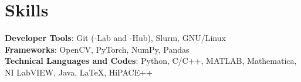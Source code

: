 \documentclass[letterpaper,11pt]{article}
\begin{document}
\section{Skills}
 \begin{itemize}[leftmargin=0.15in, label={}]
    \small{\item{
     \textbf{Developer Tools}{: Git (-Lab and -Hub), Slurm, GNU/Linux} \\
     \textbf{Frameworks}{: OpenCV, PyTorch, NumPy, Pandas} \\
     \textbf{Technical Languages and Codes}{: Python, C/C++, MATLAB, Mathematica, NI LabVIEW, Java, LaTeX, HiPACE++} \\
    }}
 \end{itemize}


\end{document}
